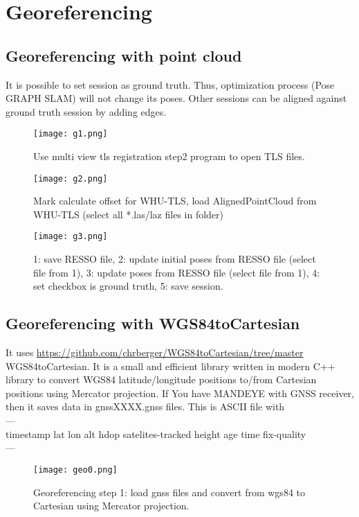 \chapter{Georeferencing}
\section{Georeferencing with point cloud}

It is possible to set session as ground truth.
Thus, optimization process (Pose GRAPH SLAM) will not change its poses.
Other sessions can be aligned against ground truth session by adding edges.

\begin{figure}[H]
	\centering
	\texttt{[image: g1.png]}
	\caption{Use multi view tls registration step2 program to open TLS files.}
	\label{fig:g1}
\end{figure}

\begin{figure}[H]
	\centering
	\texttt{[image: g2.png]}
	\caption{Mark calculate offset for WHU-TLS, load AlignedPointCloud from WHU-TLS (select all *.las/laz files in folder)}
	\label{fig:g2}
\end{figure}

\begin{figure}[H]
	\centering
	\texttt{[image: g3.png]}
	\caption{1: save RESSO file, 2: update initial poses from RESSO file (select file from 1), 3: update poses from RESSO file (select file from 1), 4: set checkbox is ground truth, 5: save session.}
	\label{fig:g3}
\end{figure}

\section{Georeferencing with WGS84toCartesian}
\label{Georeferencing_with_WGS84toCartesian}
It uses \url{https://github.com/chrberger/WGS84toCartesian/tree/master} WGS84toCartesian.
It is a small and efficient library written in modern C++ library to convert WGS84 latitude/longitude positions to/from Cartesian positions using Mercator projection.
If You have MANDEYE with GNSS receiver, then it saves data in gnssXXXX.gnss files.
This is ASCII file with\\
---\\
timestamp lat lon alt hdop satelites-tracked height age time fix-quality\\
---\
\begin{figure}[H]
	\centering
	\texttt{[image: geo0.png]}
	\caption{Georeferencing step 1: load gnss files and convert from wgs84 to Cartesian using Mercator projection.}
	\label{fig:geo0}
\end{figure}

